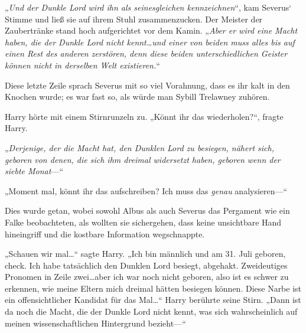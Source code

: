 „\emph{Und der Dunkle Lord wird ihn als seinesgleichen kennzeichnen}“, kam Severus‘ Stimme und ließ sie auf ihrem Stuhl zusammenzucken. Der Meister der Zaubertränke stand hoch aufgerichtet vor dem Kamin. „\emph{Aber er wird eine Macht haben, die der Dunkle Lord nicht kennt…und einer von beiden muss alles bis auf einen Rest des anderen zerstören, denn diese beiden unterschiedlichen Geister können nicht in derselben Welt existieren.}“

Diese letzte Zeile sprach Severus mit so viel Vorahnung, dass es ihr kalt in den Knochen wurde; es war fast so, als würde man Sybill Trelawney zuhören.

Harry hörte mit einem Stirnrunzeln zu. „Könnt ihr das wiederholen?“, fragte Harry.

„\emph{Derjenige, der die Macht hat, den Dunklen Lord zu besiegen, nähert sich, geboren von denen, die sich ihm dreimal widersetzt haben, geboren wenn der siebte Monat}—“

„Moment mal, könnt ihr das aufschreiben? Ich muss das \emph{genau} analysieren—“

Dies wurde getan, wobei sowohl Albus als auch Severus das Pergament wie ein Falke beobachteten, als wollten sie sichergehen, dass keine unsichtbare Hand hineingriff und die kostbare Information wegschnappte.

„Schauen wir mal…“ sagte Harry. „Ich bin männlich und am 31. Juli geboren, check. Ich habe tatsächlich den Dunklen Lord besiegt, abgehakt. Zweideutiges Pronomen in Zeile zwei…aber ich war noch nicht geboren, also ist es schwer zu erkennen, wie meine Eltern mich dreimal hätten besiegen können. Diese Narbe ist ein offensichtlicher Kandidat für das Mal…“ Harry berührte seine Stirn. „Dann ist da noch die Macht, die der Dunkle Lord nicht kennt, was sich wahrscheinlich auf meinen wissenschaftlichen Hintergrund bezieht—“


